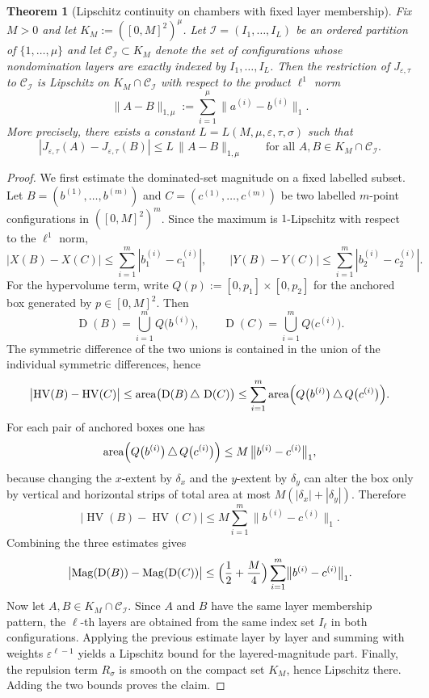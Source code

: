 \documentclass{article}
\newtheorem{theorem}{Theorem}
\newcommand{\Mag}{\operatorname{Mag}}
\newcommand{\HV}{\operatorname{HV}}
\newcommand{\Dom}{\operatorname{D}}
\begin{document}
\begin{theorem}[Lipschitz continuity on chambers with fixed layer membership]
Fix $M>0$ and let $K_M:=([0,M]^2)^\mu$. Let $\mathcal I=(I_1,\dots,I_L)$ be an ordered partition of $\{1,\dots,\mu\}$ and let $\mathcal C_{\mathcal I}\subset K_M$ denote the set of configurations whose nondomination layers are exactly indexed by $I_1,\dots,I_L$. Then the restriction of $J_{\varepsilon,\tau}$ to $\mathcal C_{\mathcal I}$ is Lipschitz on $K_M\cap \mathcal C_{\mathcal I}$ with respect to the product $\ell^1$ norm
\[
\|A-B\|_{1,\mu}:=\sum_{i=1}^\mu \|a^{(i)}-b^{(i)}\|_1.
\]
More precisely, there exists a constant $L=L(M,\mu,\varepsilon,\tau,\sigma)$ such that
\[
|J_{\varepsilon,\tau}(A)-J_{\varepsilon,\tau}(B)|\le L\,\|A-B\|_{1,\mu}
\qquad\text{for all }A,B\in K_M\cap \mathcal C_{\mathcal I}.
\]
\end{theorem}

\begin{proof}
We first estimate the dominated-set magnitude on a fixed labelled subset. Let $B=(b^{(1)},\dots,b^{(m)})$ and $C=(c^{(1)},\dots,c^{(m)})$ be two labelled $m$-point configurations in $([0,M]^2)^m$. Since the maximum is $1$-Lipschitz with respect to the $\ell^1$ norm,
\[
|X(B)-X(C)|\le \sum_{i=1}^m |b^{(i)}_1-c^{(i)}_1|,
\qquad
|Y(B)-Y(C)|\le \sum_{i=1}^m |b^{(i)}_2-c^{(i)}_2|.
\]
For the hypervolume term, write $Q(p):=[0,p_1]\times[0,p_2]$ for the anchored box generated by $p\in[0,M]^2$. Then
\[
\Dom(B)=\bigcup_{i=1}^m Q\bigl(b^{(i)}\bigr),
\qquad
\Dom(C)=\bigcup_{i=1}^m Q\bigl(c^{(i)}\bigr).
\]
The symmetric difference of the two unions is contained in the union of the individual symmetric differences, hence
\[
\bigl|\HV(B)-\HV(C)\bigr|
\le \operatorname{area}\bigl(\Dom(B)\,\triangle\,\Dom(C)\bigr)
\le \sum_{i=1}^m \operatorname{area}\Bigl(Q\bigl(b^{(i)}\bigr)\,\triangle\,Q\bigl(c^{(i)}\bigr)\Bigr).
\]
For each pair of anchored boxes one has
\[
\operatorname{area}\Bigl(Q\bigl(b^{(i)}\bigr)\,\triangle\,Q\bigl(c^{(i)}\bigr)\Bigr)
\le M\,\bigl\|b^{(i)}-c^{(i)}\bigr\|_1,
\]
because changing the $x$-extent by $\delta_x$ and the $y$-extent by $\delta_y$ can alter the box only by vertical and horizontal strips of total area at most $M(|\delta_x|+|\delta_y|)$. Therefore
\[
\bigl|\HV(B)-\HV(C)\bigr|\le M\sum_{i=1}^m \bigl\|b^{(i)}-c^{(i)}\bigr\|_1.
\]
Combining the three estimates gives
\[
\bigl|\Mag(\Dom(B)) - \Mag(\Dom(C))\bigr|
\le \Bigl(\frac12+\frac{M}{4}\Bigr)\sum_{i=1}^m \bigl\|b^{(i)}-c^{(i)}\bigr\|_1.
\]
Now let $A,B\in K_M\cap\mathcal C_{\mathcal I}$. Since $A$ and $B$ have the same layer membership pattern, the $\ell$-th layers are obtained from the same index set $I_\ell$ in both configurations. Applying the previous estimate layer by layer and summing with weights $\varepsilon^{\ell-1}$ yields a Lipschitz bound for the layered-magnitude part. Finally, the repulsion term $R_\sigma$ is smooth on the compact set $K_M$, hence Lipschitz there. Adding the two bounds proves the claim.
\end{proof}
\end{document}
